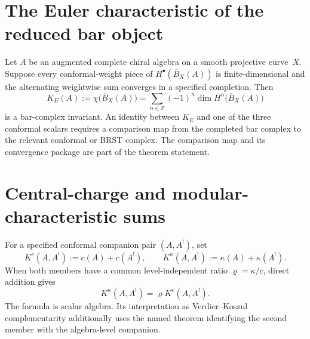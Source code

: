 \section{The Euler characteristic of the reduced bar object}
\label{sec:conductor-euler-pairing}

Let $A$ be an augmented complete chiral algebra on a smooth projective
curve~$X$.  Suppose every conformal-weight piece of
$H^\bullet(\bar B_X(A))$ is finite-dimensional and the alternating
weightwise sum converges in a specified completion.  Then
\[
 K_E(A):=\chi\bigl(\bar B_X(A)\bigr)
 =\sum_{n\in\mathbb Z}(-1)^n
 \dim H^n\bigl(\bar B_X(A)\bigr)
\]
is a bar-complex invariant.  An identity between $K_E$ and one of the
three conformal scalars requires a comparison map from the completed
bar complex to the relevant conformal or BRST complex.  The comparison
map and its convergence package are part of the theorem statement.

\section{Central-charge and modular-characteristic sums}
\label{sec:conductor-central-charge}

For a specified conformal companion pair $(A,A^!)$, set
\[
 K^c(A,A^!):=c(A)+c(A^!),\qquad
 K^\kappa(A,A^!):=\kappa(A)+\kappa(A^!).
\]
When both members have a common level-independent ratio
$\varrho=\kappa/c$, direct addition gives
\begin{equation}
 \label{eq:kappa-conductor-ratio-bridge}
 K^\kappa(A,A^!)=\varrho K^c(A,A^!).
\end{equation}
The formula is scalar algebra.  Its interpretation as Verdier--Koszul
complementarity additionally uses the named theorem identifying the
second member with the algebra-level companion.


